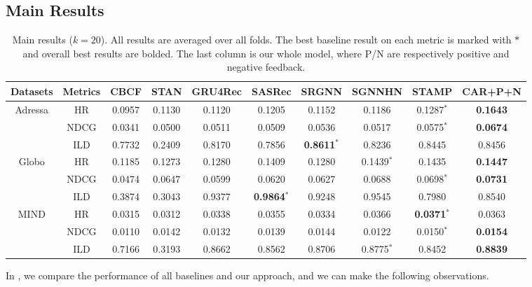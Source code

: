 \subsection{Main Results}
\label{sec:mainres}
\begin{table}[th]\setlength{\tabcolsep}{7.5pt}
\caption{Main results ($k=20$). All results are averaged over all folds. The best baseline result on 
each metric is marked with $*$ and overall best results are bolded. The last column is our whole model, where P/N are respectively positive and negative feedback.}
  \label{performance-table}
  \centering
  \renewcommand{\arraystretch}{1.2}
  \begin{tabular}{cc|ccccccc|c}
  \toprule
  Datasets&Metrics&CBCF&STAN&GRU4Rec&SASRec&SRGNN&SGNNHN&STAMP&CAR+P+N \\ 
  \midrule
  \multirow{3}{*}{Adressa} & HR & 0.0957 & 0.1130 & 0.1120 & 0.1205 & 0.1152 & 0.1186 & 0.1287$^*$ & \textbf{0.1643} \\ 
  \cline{2-10}
  & NDCG & 0.0341 & 0.0500 & 0.0511 & 0.0509 & 0.0536 & 0.0517 & 0.0575$^*$ & \textbf{0.0674} \\ 
  \cline{2-10}
  & ILD & 0.7732 & 0.2409 & 0.8170 & 0.7856 & \textbf{0.8611}$^*$ & 0.8236 & 0.8445 & 0.8456\\ 
  \midrule
  \multirow{3}{*}{Globo} & HR & 0.1185 & 0.1273 & 0.1280 & 0.1409 & 0.1280 & 0.1439$^*$ & 0.1435 & \textbf{0.1447}\\ 
  \cline{2-10}
  & NDCG & 0.0474 & 0.0647 & 0.0599 & 0.0620 & 0.0627 & 0.0688 & 0.0698$^*$ & \textbf{0.0731}\\ 
  \cline{2-10}
  & ILD & 0.3874 & 0.3043 & 0.9377 & \textbf{0.9864}$^*$ & 0.9248 & 0.9545 & 0.7980 & 0.8540\\ 
  \midrule
  \multirow{3}{*}{MIND} & HR & 0.0315 & 0.0312 & 0.0338 & 0.0355 & 0.0334 & 0.0366 & \textbf{0.0371}$^*$ & 0.0363\\ 
  \cline{2-10}
  & NDCG & 0.0110 & 0.0142 & 0.0132 & 0.0139 & 0.0144 & 0.0122 & 0.0150$^*$ & \textbf{0.0154}\\
  \cline{2-10} 
  & ILD & 0.7166 & 0.3193 & 0.8662 & 0.8562 & 0.8706 & 0.8775$^*$ & 0.8452 & \textbf{0.8839}\\ 
  \bottomrule
\end{tabular}
\end{table}

In , we compare the performance of all baselines and our
approach, and we can make the following observations.

